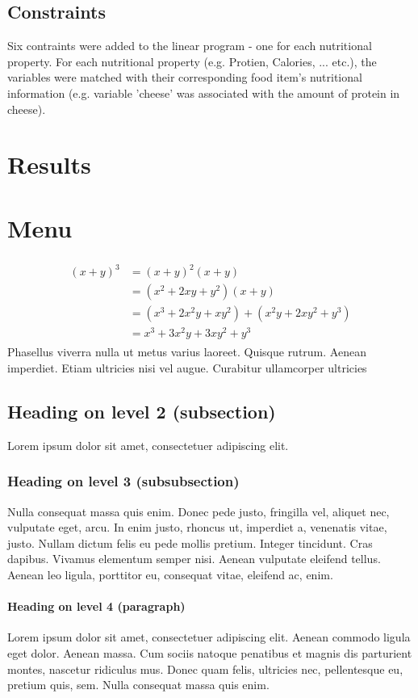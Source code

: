 \documentclass[paper=a4, fontsize=11pt]{scrartcl}
\numberwithin{equation}{section}		%
\numberwithin{figure}{section}			%
\numberwithin{table}{section}				%
\begin{document}
\subsection{Constraints}
Six contraints were added to the linear program - one for each nutritional property. For each nutritional property (e.g. Protien, Calories, ... etc.), the variables were matched with their corresponding food item's nutritional information (e.g. variable 'cheese' was associated with the amount of protein in cheese).

\section{Results}

\section{Menu}


\begin{align} 
	\begin{split}
	(x+y)^3 	&= (x+y)^2(x+y)\\
					&=(x^2+2xy+y^2)(x+y)\\
					&=(x^3+2x^2y+xy^2) + (x^2y+2xy^2+y^3)\\
					&=x^3+3x^2y+3xy^2+y^3
	\end{split}					
\end{align}
Phasellus viverra nulla ut metus varius laoreet. Quisque rutrum. Aenean imperdiet. Etiam ultricies nisi vel augue. Curabitur ullamcorper ultricies 

\subsection{Heading on level 2 (subsection)}
Lorem ipsum dolor sit amet, consectetuer adipiscing elit. 

\subsubsection{Heading on level 3 (subsubsection)}
Nulla consequat massa quis enim. Donec pede justo, fringilla vel, aliquet nec, vulputate eget, arcu. In enim justo, rhoncus ut, imperdiet a, venenatis vitae, justo. Nullam dictum felis eu pede mollis pretium. Integer tincidunt. Cras dapibus. Vivamus elementum semper nisi. Aenean vulputate eleifend tellus. Aenean leo ligula, porttitor eu, consequat vitae, eleifend ac, enim.

\paragraph{Heading on level 4 (paragraph)}
Lorem ipsum dolor sit amet, consectetuer adipiscing elit. Aenean commodo ligula eget dolor. Aenean massa. Cum sociis natoque penatibus et magnis dis parturient montes, nascetur ridiculus mus. Donec quam felis, ultricies nec, pellentesque eu, pretium quis, sem. Nulla consequat massa quis enim. 
\end{document}

